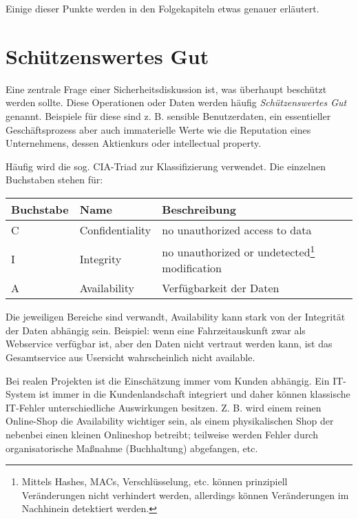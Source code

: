 Einige dieser Punkte werden in den Folgekapiteln etwas genauer erläutert.

\section{Schützenswertes Gut}

Eine zentrale Frage einer Sicherheitsdiskussion ist, was überhaupt beschützt werden sollte. Diese Operationen oder Daten werden häufig \textit{Schützenswertes Gut} genannt. Beispiele für diese sind z. B. sensible Benutzerdaten, ein essentieller Geschäftsprozess aber auch immaterielle Werte wie die Reputation eines Unternehmens, dessen Aktienkurs oder intellectual property.

Häufig wird die sog. CIA-Triad zur Klassifizierung verwendet. Die einzelnen Buchstaben stehen für:

\begin{table}[h!]
	\begin{center}
\begin{tabular}{llp{5cm}}
	\toprule
	Buchstabe & Name & Beschreibung \\
	\midrule
	C & Confidentiality & no unauthorized access to data \\
	I & Integrity & no unauthorized or undetected\footnote{Mittels Hashes, MACs, Verschlüsselung, etc. können prinzipiell Veränderungen nicht verhindert werden, allerdings können Veränderungen im Nachhinein detektiert werden.} modification \\
	A & Availability & Verfügbarkeit der Daten \\
	\bottomrule
\end{tabular}
\end{center}
\end{table}

Die jeweiligen Bereiche sind verwandt, Availability kann stark von der Integrität der Daten abhängig sein. Beispiel: wenn eine Fahrzeitauskunft zwar als Webservice verfügbar ist, aber den Daten nicht vertraut werden kann, ist das Gesamtservice aus Usersicht wahrscheinlich nicht available.

Bei realen Projekten ist die Einschätzung immer vom Kunden abhängig. Ein IT-System ist immer in die Kundenlandschaft integriert und daher können klassische IT-Fehler unterschiedliche Auswirkungen besitzen. Z. B. wird einem reinen Online-Shop die Availability wichtiger sein, als einem physikalischen Shop der nebenbei einen kleinen Onlineshop betreibt; teilweise werden Fehler durch organisatorische Maßnahme (Buchhaltung) abgefangen, etc.

